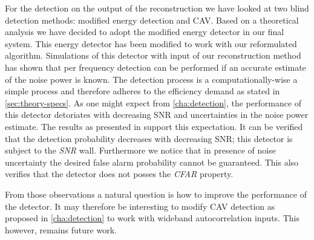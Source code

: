 \documentclass[a4paper, openany, oneside]{memoir}
\begin{document}
For the detection on the output of the reconstruction we have looked at two blind detection methods: modified energy detection and CAV. Based on  a theoretical analysis we have decided to adopt the modified energy detector in our final system. This energy detector has been modified to work with our reformulated algorithm.
Simulations of this detector with input of our reconstruction method has shown that per frequency detection
can be performed if an accurate estimate of the noise power is known. The detection process is a computationally-wise a simple process and therefore adheres to the efficiency demand as stated in \cref{sec:theory-specs}.  As one might expect from \cref{cha:detection}, the performance of this detector detoriates with decreasing SNR and uncertainties in the noise power estimate. The results as presented in  support this expectation. It can be verified that the detection probability decreases with decreasing SNR; this detector is subject to the \emph{SNR} wall. Furthermore we notice that in presence of noise uncertainty the desired false alarm probability cannot be guaranteed. This also verifies that the detector does not posses the \emph{CFAR} property.

From those observations a natural question is how to improve the performance of the detector. It may therefore be interesting to modify CAV detection as proposed in \cref{cha:detection} to work with wideband autocorrelation inputs. This however, remains future work. 
\end{document}
